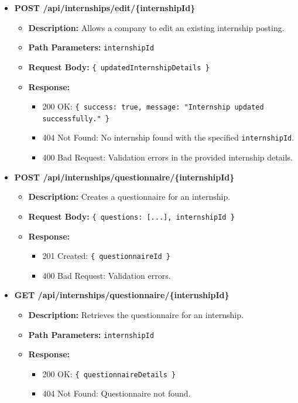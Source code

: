 \begin{itemize}
    \item \textbf{POST /api/internships/edit/\{internshipId\}}  
    \begin{itemize}
        \item \textbf{Description:} Allows a company to edit an existing internship posting.
        \item \textbf{Path Parameters:} \texttt{internshipId}
        \item \textbf{Request Body:} \texttt{\{ updatedInternshipDetails \}}
        \item \textbf{Response:}
        \begin{itemize}
            \item 200 OK: \texttt{\{ success: true, message: "Internship updated successfully." \}}
            \item 404 Not Found: No internship found with the specified \texttt{internshipId}.
            \item 400 Bad Request: Validation errors in the provided internship details.
        \end{itemize}
    \end{itemize}


    
    \item \textbf{POST /api/internships/questionnaire/\{internshipId\}}  
    \begin{itemize}
        \item \textbf{Description:} Creates a questionnaire for an internship.
        \item \textbf{Request Body:} \texttt{\{ questions: [...], internshipId \}}
        \item \textbf{Response:}
        \begin{itemize}
            \item 201 Created: \texttt{\{ questionnaireId \}}
            \item 400 Bad Request: Validation errors.
        \end{itemize}
    \end{itemize}
    
    \item \textbf{GET /api/internships/questionnaire/\{internshipId\}}  
    \begin{itemize}
        \item \textbf{Description:} Retrieves the questionnaire for an internship.
        \item \textbf{Path Parameters:} \texttt{internshipId}
        \item \textbf{Response:}
        \begin{itemize}
            \item 200 OK: \texttt{\{ questionnaireDetails \}}
            \item 404 Not Found: Questionnaire not found.
        \end{itemize}
    \end{itemize}


\end{itemize}
